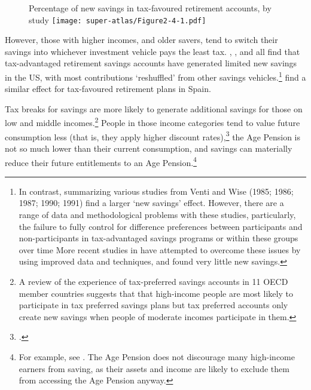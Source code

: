 \begin{figure}
%
{Percentage of new savings in tax-favoured retirement accounts, by study}\label{fig:SUPER-2-4}
\texttt{[image: super-atlas/Figure2-4-1.pdf]}

\end{figure}

However, those with higher incomes, and older savers, tend to switch their savings into whichever investment vehicle pays the least tax.  \textcite{EngenGale2000}, \textcite{AttanasioBanksWakefield2004}, and \textcite{Benjamin2003} all find that tax-advantaged retirement savings accounts have generated limited new savings in the US, with most contributions ‘reshuffled’ from other savings vehicles.\footnote{In contrast, \textcite{PoterbaVentiWise1996} summarizing various studies from Venti and Wise (1985; 1986; 1987; 1990; 1991) find a larger ‘new savings’ effect. 
However, there are a range of data and methodological problems with these studies, particularly, the failure to fully control for difference preferences between participants and non-participants in tax-advantaged savings programs or within these groups over time \textcite{EngenGaleScholz1996} More recent studies in \textcites{Benjamin2003}{EngenGale2000}  have attempted to overcome these issues by using improved data and techniques, and found very little new savings.}    \textcite{AyusoJimenoVillanueva2007} find a similar effect for tax-favoured retirement plans in Spain. 

Tax breaks for savings are more likely to generate additional savings for those on low and middle incomes.\footnote{\textcite{OECD2007EncourageSavingsThroughTaxPreferredAccounts} A review of the experience of tax-preferred savings accounts in 11 OECD member countries suggests that that high-income people are most likely to participate in tax preferred savings plans but tax preferred accounts only create new savings when people of moderate incomes participate in them.}
People in those income categories tend to value future consumption less (that is, they apply higher discount rates),\footcite{DynanSkinnerZeldes2004} the Age Pension is not so much lower than their current consumption, and savings can materially reduce their future entitlements to an Age Pension.\footnote{For example, see \textcite{BlundellEmmersonWafefield2006}. The Age Pension does not discourage many high-income earners from saving, as their assets and income are likely to exclude them from accessing the Age Pension anyway.} 

